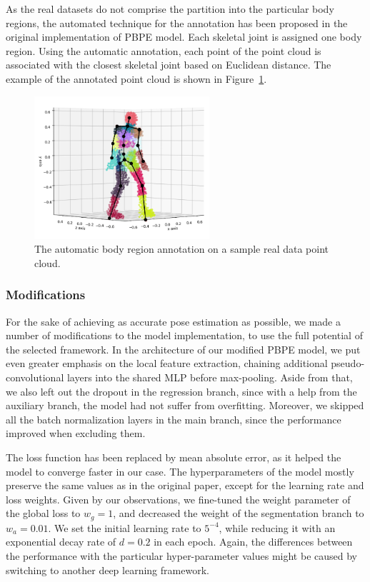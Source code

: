 \noindent 
As the real datasets do not comprise the partition into the particular body regions, the automated technique for the annotation has been proposed in the original implementation of PBPE model. Each skeletal joint is assigned one body region. Using the automatic annotation, each point of the point cloud is associated with the closest skeletal joint based on Euclidean distance. The example of the annotated point cloud is shown in Figure~\ref{fig:reg_annotation}.\par 

\vspace{5mm}
\begin{figure}[H]
\begin{center}
  \includegraphics[height=200px]{images/implementation/region_annotation.png}
  \caption[The automatic body region annotation on real data.]{The automatic body region annotation on a sample real data point cloud.}
  \label{fig:reg_annotation}
\end{center}
\end{figure}

\subsubsection{Modifications}
For the sake of achieving as accurate pose estimation as possible, we made a number of modifications to the model implementation, to use the full potential of the selected framework. In the architecture of our modified PBPE model, we put even greater emphasis on the local feature extraction, chaining additional pseudo-convolutional layers into the shared MLP before max-pooling. Aside from that, we also left out the dropout in the regression branch, since with a help from the auxiliary branch, the model had not suffer from overfitting. Moreover, we skipped all the batch normalization layers in the main branch, since the performance improved when excluding them.\par
\vspace{5mm}
\noindent
The loss function has been replaced by mean absolute error, as it helped the model to converge faster in our case. The hyperparameters of the model mostly preserve the same values as in the original paper, except for the learning rate and loss weights. Given by our observations, we fine-tuned the weight parameter of the global loss to $w_g=1$, and decreased the weight of the segmentation branch to $w_a = 0.01$. We set the initial learning rate to $5^{-4}$, while reducing it with an exponential decay rate of $d = 0.2$ in each epoch. Again, the differences between the performance with the particular hyper-parameter values might be caused by switching to another deep learning framework. 


